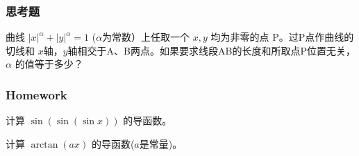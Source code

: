 \documentclass[CJK,13pt]{beamer}
\begin{document}
\begin{frame}
  \frametitle{思考题}

  
曲线 $|x|^\alpha+|y|^\alpha=1$ ($\alpha$为常数）上任取一个 $x, y$ 均为非零的点 P。过P点作曲线的切线和 $x$轴，$y$轴相交于A、B两点。如果要求线段AB的长度和所取点P位置无关，$\alpha$ 的值等于多少？  
\end{frame}

\begin{frame}
  \frametitle{Homework}
  \bitem
\item{计算 $\sin(\sin(\sin x))$ 的导函数。}
\item{计算 $\arctan (ax)$ 的导函数($a$是常量)。}
  \eitem
\end{frame}


\ech
\end{document}

